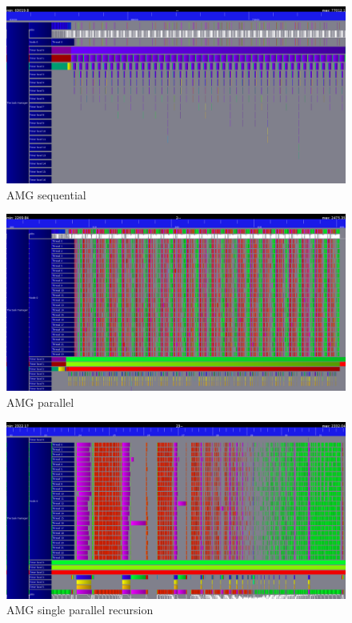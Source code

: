 \documentclass[a4paper,11pt]{scrartcl}
\begin{document}
\begin{figure}
    \includegraphics[width=1\textwidth]{seq.png}
    \caption{AMG sequential}
\end{figure}

\begin{figure}
    \includegraphics[width=1\textwidth]{iterations_trace.png}
    \caption{AMG parallel}
\end{figure}

\begin{figure}
    \includegraphics[width=1\textwidth]{one_iteration.png}
    \caption{AMG single parallel recursion}
\end{figure}

{}

\end{document}
